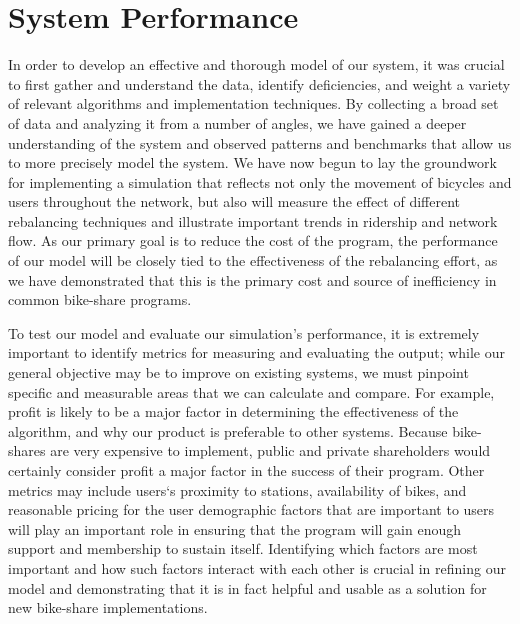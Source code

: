 \documentclass{sig-alternate}
\begin{document}
\section{System Performance}
In order to develop an effective and thorough model of our system, it was crucial to first gather and understand the data, identify deficiencies, and weight a variety of relevant algorithms and implementation techniques. By collecting a broad set of data and analyzing it from a number of angles, we have gained a deeper understanding of the system and observed patterns and benchmarks that allow us to more precisely model the system. We have now begun to lay the groundwork for implementing a simulation that reflects not only the movement of bicycles and users throughout the network, but also will measure the effect of different rebalancing techniques and illustrate important trends in ridership and network flow. As our primary goal is to reduce the cost of the program, the performance of our model will be closely tied to the effectiveness of the rebalancing effort, as we have demonstrated that this is the primary cost and source of inefficiency in common bike-share programs.\newline

        	To test our model and evaluate our simulation's performance, it is extremely important to identify metrics for measuring and evaluating the output; while our general objective may be to improve on existing systems, we must pinpoint specific and measurable areas that we can calculate and compare. For example, profit is likely to be a major factor in determining the effectiveness of the algorithm, and why our product is preferable to other systems. Because bike-shares are very expensive to implement, public and private shareholders would certainly consider profit a major factor in the success of their program. Other metrics may include users`s proximity to stations, availability of bikes, and reasonable pricing for the user demographic factors that are important to users will play an important role in ensuring that the program will gain enough support and membership to sustain itself. Identifying which factors are most important and how such factors interact with each other is crucial in refining our model and demonstrating that it is in fact helpful and usable as a solution for new bike-share implementations.\newline
	
\end{document}
